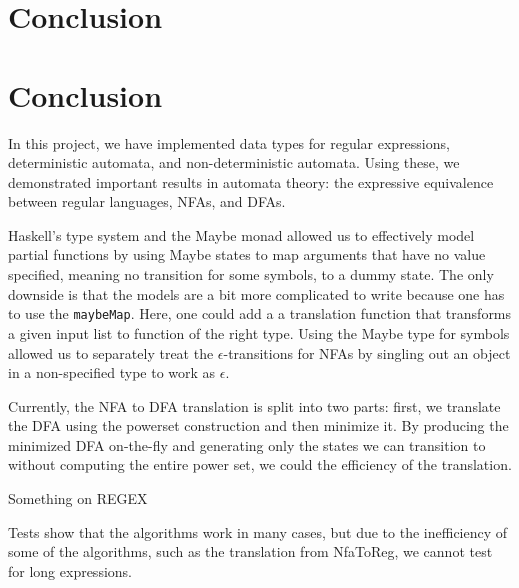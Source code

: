 \section{Conclusion}\label{sec:Conclusion}

\section{Conclusion}\label{sec
}

In this project, we have implemented data types for regular expressions, deterministic automata, and non-deterministic automata. Using these, we demonstrated important results in automata theory: the expressive equivalence between regular languages, NFAs, and DFAs.

Haskell's type system and the Maybe monad allowed us to effectively model partial functions by using Maybe states to map arguments that have no value specified, meaning no transition for some symbols, to a dummy state. The only downside is that the models are a bit more complicated to write because one has to use the \texttt{maybeMap}. Here, one could add a a translation function that transforms a given input list to function of the right type. 
Using the Maybe type for symbols allowed us to separately treat the $\epsilon$-transitions for NFAs by singling out an object in a non-specified type to work as $\epsilon$. 

Currently, the NFA to DFA translation is split into two parts: first, we translate the DFA using the powerset construction and then minimize it. By producing the minimized DFA on-the-fly and generating only the states we can transition to without computing the entire power set, we could the efficiency of the translation.

Something on REGEX

Tests show that the algorithms work in many cases, but due to the inefficiency of some of the algorithms, such as the translation from NfaToReg, we cannot test for long expressions. 




